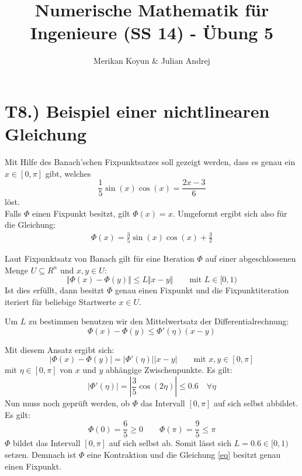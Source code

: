 \documentclass[11pt]{article}
\theoremstyle{plain}
\theoremstyle{definition}
\renewcommand{\a}{\"{a}}
\renewcommand{\o}{\"{o}}
\renewcommand{\u}{\"{u}}
\begin{document}
\title{Numerische Mathematik f\u r Ingenieure (SS 14) - \"{U}bung 5}
\author{Merikan Koyun \& Julian Andrej}
\maketitle

\section*{T8.) Beispiel einer nichtlinearen Gleichung}
Mit Hilfe des Banach'schen Fixpunktsatzes soll gezeigt werden, dass es genau ein $x \in [0,\pi]$ gibt, welches 
\begin{equation}
\frac{1}{5}\sin(x)\cos(x) = \frac{2x-3}{6}
\label{eq}
\end{equation}
l\o st.\\
Falls $\Phi$ einen Fixpunkt besitzt, gilt $\Phi(x) = x$. Umgeformt ergibt sich also f\u r die Gleichung:
\begin{align}
\Phi(x) = \frac{3}{5}\sin(x)\cos(x)+\frac{3}{2}
\end{align}

Laut Fixpunktsatz von Banach gilt f\u r eine Iteration $\Phi$ auf einer abgeschlossenen Menge $U \subseteq R^n$ und $x,y \in U$:
\begin{equation}
\Vert \Phi(x)-\Phi(y) \Vert \leq L \Vert x-y \Vert \qquad \text{mit } L \in [0,1)
\end{equation}
Ist dies erf\u llt, dann besitzt $\Phi$ genau einen Fixpunkt und die Fixpunktiteration iteriert f\u r beliebige Startwerte $x \in U$.

Um $L$ zu bestimmen benutzen wir den Mittelwertsatz der Differentialrechnung:
\begin{equation}
\Phi(x)-\Phi(y) \leq \Phi'(\eta) (x-y)
\end{equation}

Mit diesem Ansatz ergibt sich:
\begin{equation}
|\Phi(x)- \Phi(y) | = |\Phi'(\eta)||x-y| \qquad \text{mit } x,y \in [0,\pi]
\end{equation}
mit $\eta \in [0,\pi]$ von $x$ und $y$ abh\a ngige Zwischenpunkte.
Es gilt:
\begin{equation}
|\Phi'(\eta)| = \left|\frac{3}{5}\cos(2 \eta)\right| \leq 0.6 \quad \forall \eta
\end{equation}
Nun muss noch gepr\u ft werden, ob $\Phi$ das Intervall $[0, \pi]$ auf sich selbst abbildet. Es gilt:
\begin{equation}
\Phi(0)=\frac{6}{5} \geq 0 \qquad \Phi(\pi) = \frac{9}{5} \leq \pi
\end{equation}
$\Phi$ bildet das Intervall $[0, \pi]$ auf sich selbst ab.
Somit l\a sst sich $L=0.6 \in [0,1)$ setzen. Demnach ist $\Phi$ eine Kontraktion und die Gleichung \eqref{eq} besitzt genau einen Fixpunkt.
\end{document}
